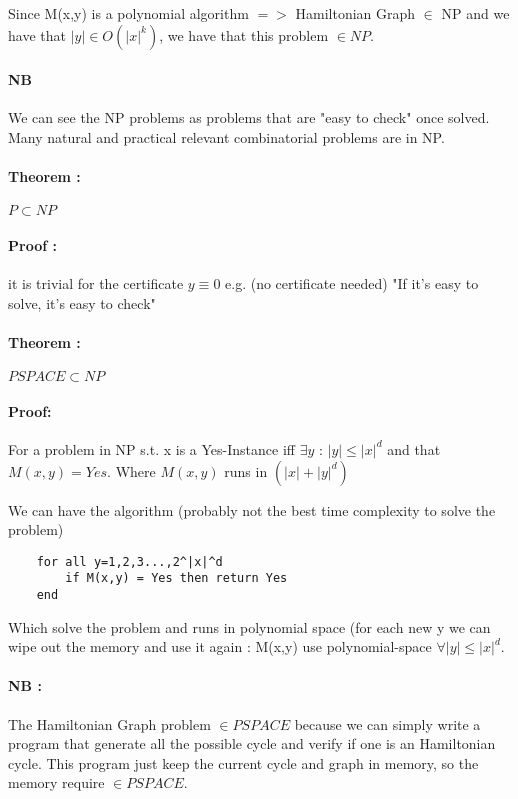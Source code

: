 Since M(x,y) is a polynomial algorithm $=>$ Hamiltonian Graph $\in$ NP and we have that $|y| \in O(|x|^k)$, we have that this problem $\in NP$.

\paragraph{NB} We can see the NP problems as problems that are "easy to check" once solved.
Many natural and practical relevant combinatorial problems are in NP.

\paragraph{Theorem :} $P\subset NP$

\paragraph{Proof :}
it is trivial for the certificate $y\equiv 0$ e.g. (no certificate needed) "If it's easy to solve, it's easy to check"

\paragraph{Theorem :} $PSPACE \subset NP$

\paragraph{Proof: }
For a problem in NP s.t. x is a Yes-Instance iff $\exists y$ : $|y|\leq|x|^d$ and  that
$M(x,y)=Yes$. Where $M(x,y)$ runs in $(|x|+|y|^d)$

We can have the algorithm (probably not the best time complexity to solve the problem)
\begin{lstlisting}
    for all y=1,2,3...,2^|x|^d
        if M(x,y) = Yes then return Yes
    end
\end{lstlisting}

Which solve the problem and runs in polynomial space (for each new y we can wipe out the memory and use it again : M(x,y) use polynomial-space $\forall |y| \leq |x|^d$.
\paragraph{NB :}
The Hamiltonian Graph problem $\in PSPACE$ because we can simply write a program that generate all the possible cycle and
verify if one is an Hamiltonian cycle. This program just keep the current cycle and graph in memory, so the memory require $\in PSPACE$.

